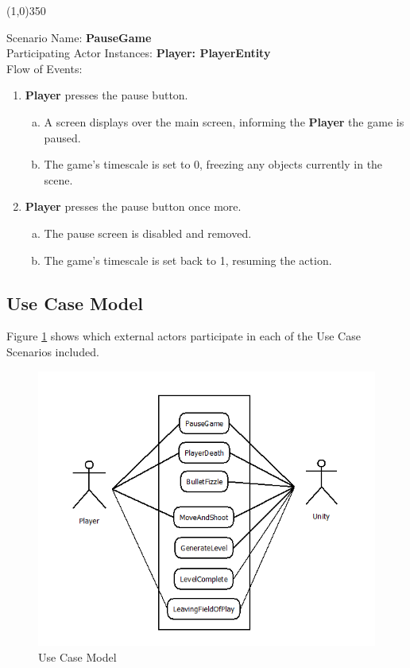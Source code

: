 \documentclass[12pt]{article}       %
\begin{document}
\begin{center} \line(1,0){350} \end{center}
Scenario Name: {\bf PauseGame} \\
Participating Actor Instances:        \hspace{46pt} {\bf Player: PlayerEntity }  \vspace{10pt}  \\ 
Flow of Events: 
\begin{enumerate} 
\item {\bf Player} presses the pause button.
	\begin{enumerate} [a.]
	\item A screen displays over the main screen, informing the {\bf Player} the game is paused.
	\item The game's timescale is set to 0, freezing any objects currently in the scene.
	\end{enumerate}
\item {\bf Player} presses the pause button once more. 
	\begin{enumerate} [a.]
	\item The pause screen is disabled and removed.
	\item The game's timescale is set back to 1, resuming the action.
	\end{enumerate}
\end{enumerate}


\subsection{Use Case Model}
Figure \ref{Use Case Model} shows which external actors participate in each of the Use Case Scenarios included.

\begin{figure} [H]
\centering
\includegraphics[width=5.5in]{UseCaseModel1.png}
\caption{Use Case Model} \label{Use Case Model}
\end{figure}
\end{document}

